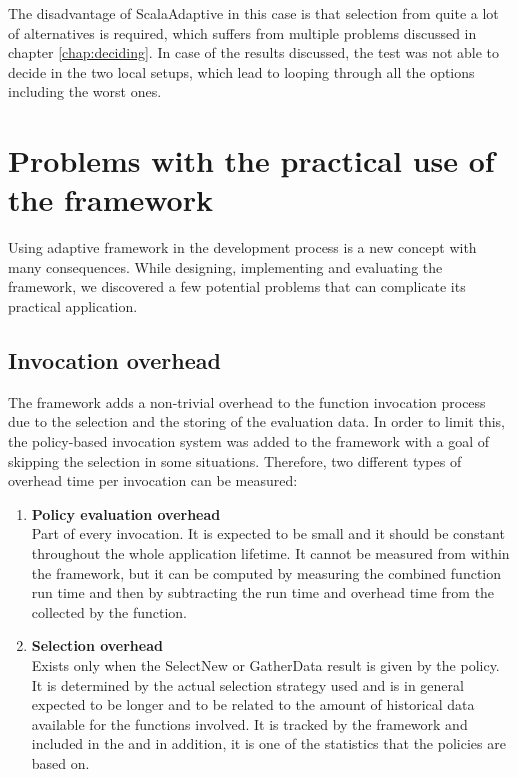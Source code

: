 The disadvantage of ScalaAdaptive in this case is that selection from quite a lot of alternatives is required, which suffers from multiple problems discussed in chapter \ref{chap:deciding}. In case of the results discussed, the test was not able to decide in the two local setups, which lead to looping through all the options including the worst ones.

\section{Problems with the practical use of the framework}

Using adaptive framework in the development process is a new concept with many consequences. While designing, implementing and evaluating the framework, we discovered a few potential problems that can complicate its practical application.

\subsection{Invocation overhead}

The framework adds a non-trivial overhead to the function invocation process due to the selection and the storing of the evaluation data. In order to limit this, the policy-based invocation system was added to the framework with a goal of skipping the selection in some situations. Therefore, two different types of overhead time per invocation can be measured:

\begin{enumerate}
	\item \textbf{Policy evaluation overhead}\\
	Part of every invocation. It is expected to be small and it should be constant throughout the whole application lifetime. It cannot be measured from within the framework, but it can be computed by measuring the combined function run time and then by subtracting the run time and overhead time from the  collected by the function.
	\item \textbf{Selection overhead}\\
	Exists only when the SelectNew or GatherData result is given by the policy. It is determined by the actual selection strategy used and is in general expected to be longer and to be related to the amount of historical data available for the functions involved. It is tracked by the framework and included in the  and in addition, it is one of the statistics that the policies are based on.
\end{enumerate}

